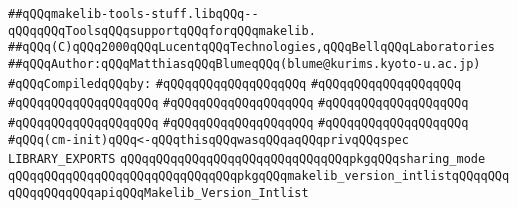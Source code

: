 \label{src/lib/core/makelib/makelib-tools-stuff.lib}
\verb|##qQQqmakelib-tools-stuff.libqQQq--qQQqqQQqToolsqQQqsupportqQQqforqQQqmakelib.|\newline
\verb|##qQQq(C)qQQq2000qQQqLucentqQQqTechnologies,qQQqBellqQQqLaboratories|\newline
\verb|##qQQqAuthor:qQQqMatthiasqQQqBlumeqQQq(blume@kurims.kyoto-u.ac.jp)|\newline
\newline
\verb|#qQQqCompiledqQQqby:|\newline
\verb|#qQQqqQQqqQQqqQQqqQQq|\newline
\verb|#qQQqqQQqqQQqqQQqqQQq|\newline
\verb|#qQQqqQQqqQQqqQQqqQQq|\newline
\verb|#qQQqqQQqqQQqqQQqqQQq|\newline
\verb|#qQQqqQQqqQQqqQQqqQQq|\newline
\verb|#qQQqqQQqqQQqqQQqqQQq|\newline
\verb|#qQQqqQQqqQQqqQQqqQQq|\newline
\verb|#qQQqqQQqqQQqqQQqqQQq|\newline
\newline
\newline
\verb|#qQQq(cm-init)qQQq<-qQQqthisqQQqwasqQQqaqQQqprivqQQqspec|\newline
\newline
\verb|LIBRARY_EXPORTS|\newline
\newline
\verb|qQQqqQQqqQQqqQQqqQQqqQQqqQQqqQQqpkgqQQqsharing_mode|\newline
\verb|qQQqqQQqqQQqqQQqqQQqqQQqqQQqqQQqpkgqQQqmakelib_version_intlistqQQqqQQqqQQqqQQqqQQqapiqQQqMakelib_Version_Intlist|\newline
